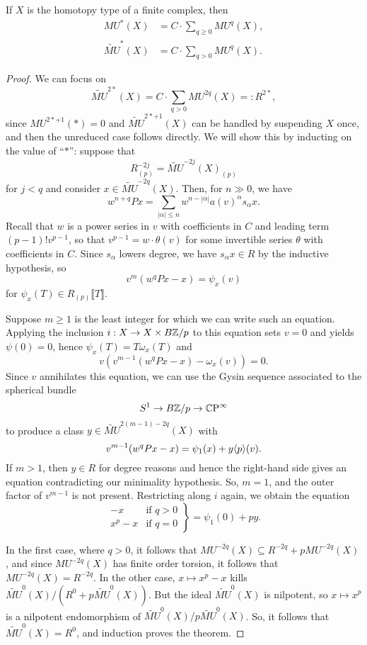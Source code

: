 \begin{theorem}
If $X$ is the homotopy type of a finite complex, then
\begin{align*}
MU^*(X) & = C \cdot \sum_{q \ge 0} MU^q(X), \\
\widetilde{MU}^*(X) & = C \cdot \sum_{q > 0} MU^q(X).
\end{align*}
\end{theorem}
\begin{proof}
We can focus on \[\widetilde{MU}^{2*}(X) = C \cdot \sum_{q > 0} MU^{2q}(X) =: R^{2*},\] since $MU^{2*+1}(*) = 0$ and $\widetilde{MU}^{2*+1}(X)$ can be handled by suspending $X$ once, and then the unreduced case follows directly.  We will show this by inducting on the value of ``$*$'': suppose that \[R^{-2j}_{(p)} = \widetilde{MU}^{-2j}(X)_{(p)}\] for $j < q$ and consider $x \in \widetilde{MU}^{-2q}(X)$.  Then, for $n \gg 0$, we have \[w^{n+q} P x = \sum_{|\alpha| \le n} w^{n - |\alpha|} a(v)^\alpha s_\alpha x.\]  Recall that $w$ is a power series in $v$ with coefficients in $C$ and leading term $(p-1)! v^{p-1}$, so that $v^{p-1} = w \cdot \theta(v)$ for some invertible series $\theta$ with coefficients in $C$.  Since $s_\alpha$ lowers degree, we have $s_\alpha x \in R$ by the inductive hypothesis, so \[v^m(w^qPx - x) = \psi_x(v)\] for $\psi_x(T) \in R_{(p)}\llbracket T \rrbracket$.

Suppose $m \ge 1$ is the least integer for which we can write such an equation.  Applying the inclusion $i: X \to X \times B\mathbb Z/p$ to this equation sets $v = 0$ and yields $\psi(0) = 0$, hence $\psi_x(T) = T \omega_x(T)$ and \[v (v^{m-1}(w^qPx - x) - \omega_x(v)) = 0.\]  Since $v$ annihilates this equation, we can use the Gysin sequence associated to the spherical bundle \[S^1 \to B\mathbb Z/p \to \mathbb{C}\mathrm P^\infty\] to produce a class $y \in \widetilde{MU}^{2(m-1)-2q}(X)$ with \[v^{m-1}(w^q P x - x) = \psi_1(x) + y \langle p\rangle(v).\]  If $m > 1$, then $y \in R$ for degree reasons and hence the right-hand side gives an equation contradicting our minimality hypothesis.  So, $m = 1$, and the outer factor of $v^{m-1}$ is not present.  Restricting along $i$ again, we obtain the equation \[\left. \begin{array}{rr} -x & \text{if $q > 0$} \\ x^p - x & \text{if $q = 0$} \end{array} \right\} = \psi_1(0) + py.\]

In the first case, where $q > 0$, it follows that $MU^{-2q}(X) \subseteq R^{-2q} + pMU^{-2q}(X)$, and since $MU^{-2q}(X)$ has finite order torsion, it follows that $MU^{-2q}(X) = R^{-2q}$.  In the other case, $x \mapsto x^p - x$ kills $\widetilde{MU}^0(X)/(R^0 + p\widetilde{MU}^0(X))$.  But the ideal $\widetilde{MU}^0(X)$ is nilpotent, so $x \mapsto x^p$ is a nilpotent endomorphism of $\widetilde{MU}^0(X) / p\widetilde{MU}^0(X)$.  So, it follows that $\widetilde{MU}^0(X) = R^0$, and induction proves the theorem.
\end{proof}

